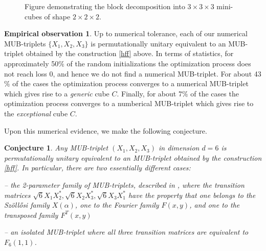 \documentclass[12pt]{amsart}
\numberwithin{equation}{section}
\newtheorem{conjecture}{Conjecture}
\theoremstyle{definition}
\newtheorem{observation}[fact]{Empirical observation}
\theoremstyle{remark}
\theoremstyle{remark}
\begin{document}
\begin{figure}


\caption{Figure demonstrating the block decomposition into $3 \times 3 \times 3$ mini-cubes of shape $2 \times 2 \times 2$. }
\label{fig_cube}
\end{figure}

\begin{observation}\label{empiricallyzauner}
Up to numerical tolerance, each of our numerical MUB-triplets $\{X_1, X_2, X_3\}$ is permutationally unitary equivalent to an MUB-triplet obtained by the construction \eqref{hff} above. In terms of statistics, for approximately 50$\%$ of the random initializations the optimization process
does not reach loss 0, and hence we do not find a numerical MUB-triplet. For about 43$\%$ of the cases the optimization process converges to a numerical MUB-triplet which gives rise to a {\it generic} cube $C$. Finally, for about 7$\%$ of the cases the optimization process converges to a numberical MUB-triplet which gives rise to the {\it exceptional} cube $C$. 
\end{observation}

Upon this numerical evidence, we make the following conjecture. 

\begin{conjecture}\label{mub3}
Any MUB-triplet $(X_1, X_2, X_3)$ in dimension $d=6$ is permutationally unitary equivalent to an MUB-triplet obtained by the construction \eqref{hff}. In particular, there are two essentially different cases:

-- the 2-parameter family of MUB-triplets, described in \cite{Sz}, where the transition matrices $\sqrt{6}X_1X_2^\ast, \sqrt{6}X_2X_3^\ast, \sqrt{6}X_3X_1^\ast$ have the property that one belongs to the Sz\"oll\H osi family $X(\alpha)$, one to the Fourier family $F(x, y)$, and one to the transposed family $F^T(x, y)$

-- an isolated MUB-triplet where all three transition matrices are equivalent to $F_6(1,1)$.

\end{conjecture}
\end{document}
